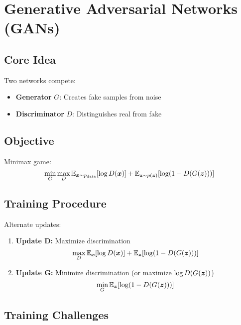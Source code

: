 
\section{Generative Adversarial Networks (GANs) }
\label{sec:gans}

\subsection{Core Idea}

Two networks compete:
\begin{itemize}
    \item \textbf{Generator} $G$: Creates fake samples from noise
    \item \textbf{Discriminator} $D$: Distinguishes real from fake
\end{itemize}

\subsection{Objective}

Minimax game:
\begin{equation}
\min_G \max_D \mathbb{E}_{\boldsymbol{x} \sim p_{\text{data}}}[\log D(\boldsymbol{x})] + \mathbb{E}_{\boldsymbol{z} \sim p(\boldsymbol{z})}[\log(1 - D(G(\boldsymbol{z})))]
\end{equation}

\subsection{Training Procedure}

Alternate updates:
\begin{enumerate}
    \item \textbf{Update D:} Maximize discrimination
    \begin{equation}
    \max_D \mathbb{E}_{\boldsymbol{x}}[\log D(\boldsymbol{x})] + \mathbb{E}_{\boldsymbol{z}}[\log(1 - D(G(\boldsymbol{z})))]
    \end{equation}
    
    \item \textbf{Update G:} Minimize discrimination (or maximize $\log D(G(\boldsymbol{z}))$)
    \begin{equation}
    \min_G \mathbb{E}_{\boldsymbol{z}}[\log(1 - D(G(\boldsymbol{z})))]
    \end{equation}
\end{enumerate}

\subsection{Training Challenges}

